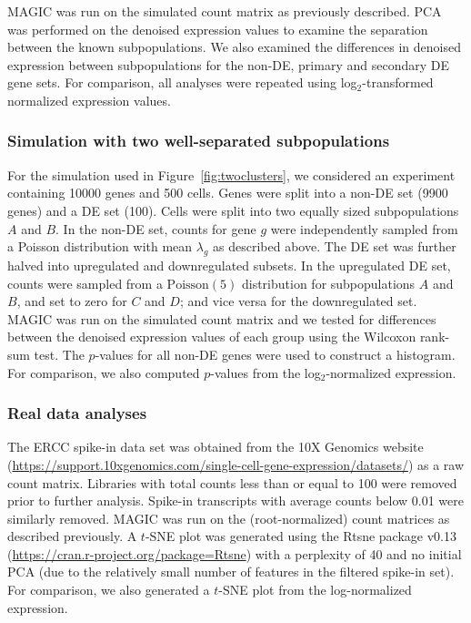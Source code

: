\documentclass[10pt,letterpaper]{article}
\begin{document}
MAGIC was run on the simulated count matrix as previously described.
PCA was performed on the denoised expression values to examine the separation between the known subpopulations.
We also examined the differences in denoised expression between subpopulations for the non-DE, primary and secondary DE gene sets.
For comparison, all analyses were repeated using log$_2$-transformed normalized expression values.

\subsubsection*{Simulation with two well-separated subpopulations}
For the simulation used in Figure~\ref{fig:twoclusters}, we considered an experiment containing 10000 genes and 500 cells.
Genes were split into a non-DE set (9900 genes) and a DE set (100).
Cells were split into two equally sized subpopulations $A$ and $B$.
In the non-DE set, counts for gene $g$ were independently sampled from a Poisson distribution with mean $\lambda_{g}$ as described above.
The DE set was further halved into upregulated and downregulated subsets.
In the upregulated DE set, counts were sampled from a $\mbox{Poisson}(5)$ distribution for subpopulations $A$ and $B$, and set to zero for $C$ and $D$;
and vice versa for the downregulated set.
MAGIC was run on the simulated count matrix and we tested for differences between the denoised expression values of each group using the Wilcoxon rank-sum test.
The $p$-values for all non-DE genes were used to construct a histogram.
For comparison, we also computed $p$-values from the log$_2$-normalized expression.

\subsubsection*{Real data analyses}
The ERCC spike-in data set was obtained from the 10X Genomics website (\url{https://support.10xgenomics.com/single-cell-gene-expression/datasets/}) as a raw count matrix.
Libraries with total counts less than or equal to 100 were removed prior to further analysis.
Spike-in transcripts with average counts below 0.01 were similarly removed.
MAGIC was run on the (root-normalized) count matrices as described previously.
A $t$-SNE plot was generated using the Rtsne package v0.13 (\url{https://cran.r-project.org/package=Rtsne}) with a perplexity of 40 and no initial PCA
(due to the relatively small number of features in the filtered spike-in set).
For comparison, we also generated a $t$-SNE plot from the log-normalized expression.
\end{document}
